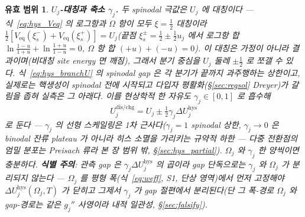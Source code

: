 \documentclass[11pt,a4paper]{article}
\newtheorem*{boundbox}{유효 범위}
\newcommand{\eq}{\mathrm{eq}}
\newcommand{\dis}{\mathrm{dis}}
\newcommand{\chg}{\mathrm{chg}}
\newcommand{\hys}{\mathrm{hys}}
\begin{document}
\begin{boundbox}
\textbf{$U_j$-대칭과 축소 $\gamma_j$.} 두 spinodal 극값은 $U_j$ 에 \emph{대칭}이다 — 식~\eqref{eq:hys_Veq} 의 로그항과
$\Omega$ 항이 모두 $\xi=\tfrac12$ 대칭이라 $\tfrac12[V_{\eq}(\xi_s^-)+V_{\eq}(\xi_s^+)]=U_j$(끝점 $\xi_s^\pm=\tfrac12\pm
\tfrac12 u_j$ 에서 로그항 합 $\ln\tfrac{1-u}{1+u}+\ln\tfrac{1+u}{1-u}=0$, $\Omega$ 항 합 $(+u)+(-u)=0$). 이 대칭은
\emph{가정이 아니라 결과}이며(비대칭 site energy 면 깨짐), 그래서 분기 중심을 $U_j$ 둘레 $\pm\tfrac12$ 로 쪼갤 수 있다.
식~\eqref{eq:hys_branchU} 의 spinodal gap 은 각 분기가 끝까지 과주행하는 \emph{상한}이고, 실제로는 핵생성이 spinodal
전에 시작되고 다입자 평활화(\S\ref{sec:regsol} Dreyer)가 갈림을 좁혀 실측은 그 아래다. 이를 \emph{현상학적} 한 자유도
$\gamma_j\in[0,1]$ 로 흡수해
\begin{equation}
U_j^{\dis/\chg}=U_j\pm\tfrac12\gamma_j\Delta U_j^\hys
\label{eq:hys_center}
\end{equation}
로 둔다 — $\gamma_j$ 의 \emph{선형} 스케일링은 1차 근사다($\gamma_j=1$ spinodal 상한, $\gamma_j\to0$ 은 binodal 잔류
plateau 가 아니라 \emph{히스 소멸}을 가리키는 규약적 하한 — 다중 전환점의 엄밀 분포는 Preisach 류라 본 장 범위 밖,
\S\ref{sec:hys_partial}). $\Omega_j$ 와 $\gamma_j$ 한 양씩이면 충분하다. \textbf{식별 주의}: 관측 gap 은
$\gamma_j\Delta U_j^\hys$ 의 \emph{곱}이라 gap 단독으로는 $\gamma_j$ 와 $\Omega_j$ 가 분리되지 않는다 — $\Omega_j$ 를 평형
\emph{폭}(식~\eqref{eq:weff}, S1, 단상 영역)에서 먼저 고정해야 $\Delta U_j^\hys(\Omega_j,T)$ 가 닫히고 그제서 $\gamma_j$ 가
gap 절편에서 분리된다(단 그 폭-경로 $\Omega_j$ 와 gap-경로는 같은 $g_j''$ 사영이라 \emph{내적 일관성}, \S\ref{sec:falsify}).
\end{boundbox}

\end{document}
